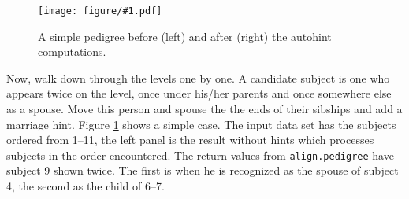 \documentclass{article}
\newcommand{\myfig}[1]{\resizebox{\textwidth}{!}
                        {\texttt{[image: figure/\#1.pdf]}}}
\begin{document}
\begin{figure}
  \myfig{autohint1}
  \caption{A simple pedigree before (left) and after (right) the
    autohint computations.}
  \label{fig:auto1}
\end{figure}

Now, walk down through the levels one by one.
A candidate subject is one who appears twice on the level, once
under his/her parents and once somewhere else as a spouse.
Move this person and spouse the the ends of their sibships and
add a marriage hint.
Figure \ref{fig:auto1} shows a simple case.  The input data set has
the subjects ordered from 1--11, the left panel is the result without
hints which processes subjects in the order encountered.
The return values from {\tt{}align.pedigree} have subject 9 shown twice.
The first is when he is recognized as the spouse of subject 4, the second
as the child of 6--7.
\end{document}

